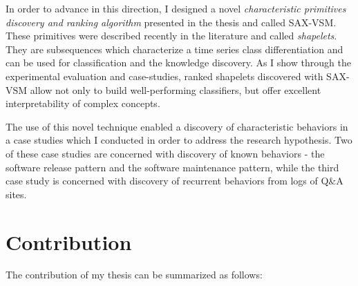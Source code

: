 \documentclass[12pt,oneside]{article}
\numberwithin{equation}{subsection}
\begin{document}
In order to advance in this direction, I designed a novel \textit{characteristic primitives
discovery and ranking algorithm} presented in the thesis and called SAX-VSM. 
These primitives were described recently in the literature and called \textit{shapelets}. They
are subsequences which characterize a time series class differentiation and can be used for
classification and the knowledge discovery. As I show through the experimental evaluation and
case-studies, ranked shapelets discovered with SAX-VSM 
allow not only to build well-performing classifiers, but offer excellent interpretability of complex
concepts.

The use of this novel technique enabled a discovery of characteristic behaviors in a case studies
which I conducted in order to address the research hypothesis. Two of these case studies are
concerned with discovery of known behaviors - the software release pattern and the software
maintenance pattern, while the third case study is concerned with discovery of recurrent
behaviors from logs of Q\&A sites.

\clearpage
\section{Contribution}
The contribution of my thesis can be summarized as follows:
\end{document}
